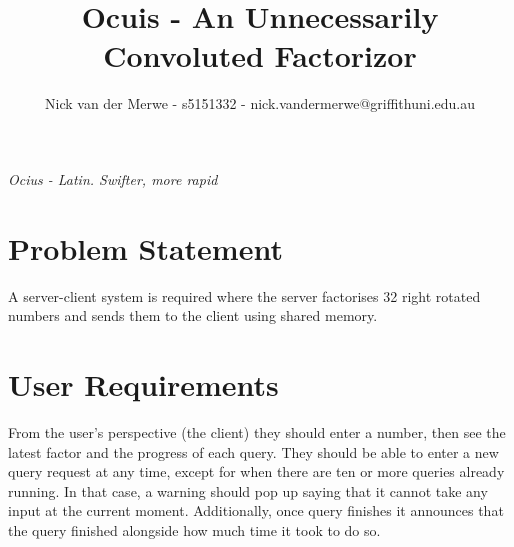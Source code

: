 \documentclass{article}
\title{Ocuis - An Unnecessarily Convoluted Factorizor}
\author{Nick van der Merwe - s5151332 - nick.vandermerwe@griffithuni.edu.au}
\begin{document}
    \maketitle


    \textit{Ocius - Latin. Swifter, more rapid}


    \section{Problem Statement}
    A server-client system is required where the server factorises 32 right
    rotated numbers and sends them to the client using shared memory.


    \section{User Requirements}
    From the user's perspective (the client) they should enter a number,
    then see the latest factor and the progress of each query.
    They should be able to enter a new query request at any time, except for
    when there are ten or more queries already running.
    In that case, a warning should pop up saying that it cannot take any input
    at the current moment.
    Additionally, once query finishes it announces that the query finished
    alongside how much time it took to do so.
\end{document}
